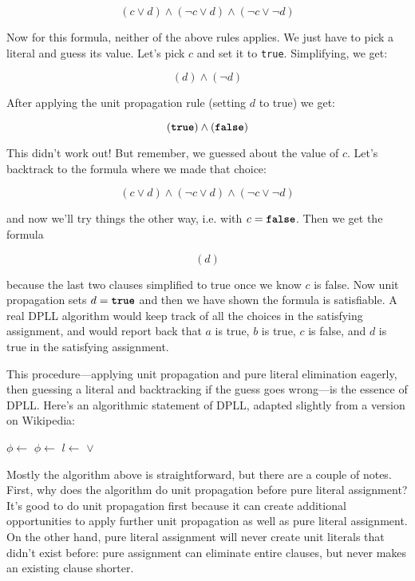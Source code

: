 \documentclass[11pt]{article}
\begin{document}
\[
(c \lor d) \land (\lnot c \lor d) \land (\lnot c \lor \lnot d)
\]

Now for this formula, neither of the above rules applies. We just have to pick a
literal and guess its value. Let's pick $c$ and set it to \texttt{true}. Simplifying, we
get:

\[
(d) \land (\lnot d)
\]

After applying the unit propagation rule (setting $d$ to true) we get:

\[
(\texttt{\textbf{true}}) \land (\texttt{\textbf{false}})
\]

This didn't work out! But remember, we guessed about the value of $c$. Let's
backtrack to the formula where we made that choice:

\[
(c \lor d) \land (\lnot c \lor d) \land (\lnot c \lor \lnot d)
\]

and now we'll try things the other way, i.e. with $c = \texttt{\textbf{false}}$.  Then we get the formula

\[
(d)
\]

because the last two clauses simplified to true once we know $c$ is false. Now
unit propagation sets $d = \texttt{\textbf{true}}$ and then we have shown the formula is
satisfiable. A real DPLL algorithm would keep track of all the choices in the
satisfying assignment, and would report back that $a$ is true, $b$ is true, $c$
is false, and $d$ is true in the satisfying assignment.

This procedure---applying unit propagation and pure literal elimination eagerly,
then guessing a literal and backtracking if the guess goes wrong---is the
essence of DPLL. Here's an algorithmic statement of DPLL, adapted slightly from
a version on Wikipedia:

\begin{algorithmic}

    \If{$\phi = \ltrue$}
        \State \Return \ltrue
    \EndIf
        \State \Return \lfalse
    \EndIf
        \State $\phi \gets$ 
    \EndFor
        \State $\phi \gets$ 
    \EndFor
    \State $l \gets$ 
    \State \Return {} $\lor$  
\EndFunction

\end{algorithmic}

Mostly the algorithm above is straightforward, but there are a couple of notes.
First, why does the algorithm do unit propagation before pure literal
assignment? It's good to do unit propagation first because it can create
additional opportunities to apply further unit propagation as well as pure
literal assignment. On the other hand, pure literal assignment will never create
unit literals that didn't exist before: pure assignment can eliminate entire
clauses, but never makes an existing clause shorter.
\end{document}
